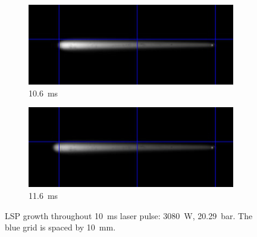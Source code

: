 \begin{figure}[h]
\begin{subfigure}[t]{0.47\textwidth}
        \end{subfigure}
        \hfill
        \begin{subfigure}[t]{0.47\textwidth}
            \centering
            \includegraphics[width=\textwidth]{assets/5 results/1msFrames/106.jpg}
            \caption{\qty{10.6}{ms}}
            \label{fig:growth_frames_106}
        \end{subfigure}
        \hfill
        \begin{subfigure}[t]{0.47\textwidth}
            \centering
            \includegraphics[width=\textwidth]{assets/5 results/1msFrames/116.jpg}
            \caption{\qty{11.6}{ms}}
            \label{fig:growth_frames_116}
        \end{subfigure}
        \caption[LSP growth throughout \qty{10}{ms} laser pulse]{LSP growth throughout \qty{10}{ms} laser pulse: \qty{3080}{W}, \qty{20.29}{bar}. The blue grid is spaced by \qty{10}{mm}. }
        \label{fig:growth_frames}
    \end{figure}

